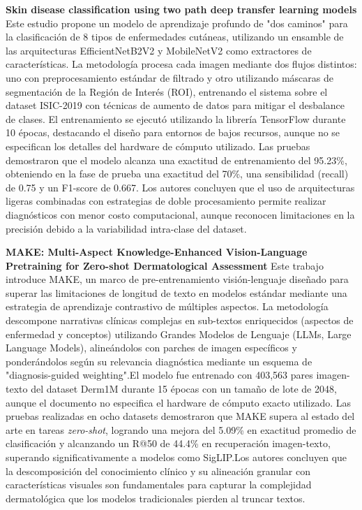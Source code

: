 \documentclass[11pt, a4paper]{article}
\begin{document}
\textbf{Skin disease classification using two path deep transfer learning models} \cite{chandna_skin_2024}
Este estudio propone un modelo de aprendizaje profundo de "dos caminos" para la clasificación de 8 tipos de enfermedades cutáneas, utilizando un ensamble de las arquitecturas EfficientNetB2V2 y MobileNetV2 como extractores de características.
La metodología procesa cada imagen mediante dos flujos distintos: uno con preprocesamiento estándar de filtrado y otro utilizando máscaras de segmentación de la Región de Interés (ROI), entrenando el sistema sobre el dataset ISIC-2019 con 
técnicas de aumento de datos para mitigar el desbalance de clases. El entrenamiento se ejecutó utilizando la librería TensorFlow durante 10 épocas, destacando el diseño para entornos de bajos recursos, aunque no se especifican los detalles 
del hardware de cómputo utilizado. Las pruebas demostraron que el modelo alcanza una exactitud de entrenamiento del 95.23\%, obteniendo en la fase de prueba una exactitud del 70\%, una sensibilidad (recall) de 0.75 y un F1-score de 0.667.
Los autores concluyen que el uso de arquitecturas ligeras combinadas con estrategias de doble procesamiento permite realizar diagnósticos con menor costo computacional, aunque reconocen limitaciones en la precisión debido a la variabilidad
intra-clase del dataset.

\textbf{MAKE: Multi-Aspect Knowledge-Enhanced Vision-Language Pretraining for Zero-shot Dermatological Assessment} \cite{yan_make_2025}
Este trabajo introduce MAKE, un marco de pre-entrenamiento visión-lenguaje diseñado para superar las limitaciones de longitud de texto en modelos estándar mediante una estrategia de aprendizaje contrastivo de múltiples aspectos. La metodología
descompone narrativas clínicas complejas en sub-textos enriquecidos (aspectos de enfermedad y conceptos) utilizando Grandes Modelos de Lenguaje (LLMs, Large Language Models), alineándolos con parches de imagen específicos y ponderándolos según
su relevancia diagnóstica mediante un esquema de "diagnosis-guided weighting".El modelo fue entrenado con 403,563 pares imagen-texto del dataset Derm1M durante 15 épocas con un tamaño de lote de 2048, aunque el documento no especifica el
hardware de cómputo exacto utilizado. Las pruebas realizadas en ocho datasets demostraron que MAKE supera al estado del arte en tareas \textit{zero-shot}, logrando una mejora del 5.09\% en exactitud promedio de clasificación y alcanzando un
R@50 de 44.4\% en recuperación imagen-texto, superando significativamente a modelos como SigLIP.Los autores concluyen que la descomposición del conocimiento clínico y su alineación granular con características visuales son fundamentales para
capturar la complejidad dermatológica que los modelos tradicionales pierden al truncar textos.
\end{document}
